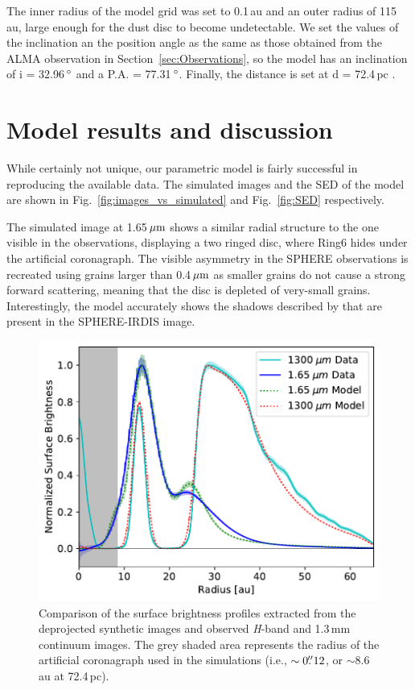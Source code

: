 \documentclass[letters,usenatbib,times]{mnras}
\begin{document}
The inner radius of the model grid was set to 0.1\,au and an outer radius of 115\,au, large enough for the dust disc to become undetectable. We set the values of the inclination an the position angle as the same as those obtained from the ALMA observation in Section~\ref{sec:Observations}, so the model has an inclination of i = 32.96\,$\hbox{$^\circ$}$ and a P.A. = 77.31\,$\hbox{$^\circ$}$. Finally, the distance is set at d = 72.4\,pc \citep{Gaia}.

\section{Model results and discussion} \label{sec:results}

While certainly not unique, our parametric model is fairly successful in reproducing the available data. The simulated images and the SED of the model are shown in Fig.~\ref{fig:images_vs_simulated} and Fig.~\ref{fig:SED} respectively.

The simulated image at 1.65\,$\hbox{$\mu$m}$ shows a similar radial structure to the one visible in the observations, displaying a two ringed disc, where Ring6 hides under the artificial coronagraph. The visible asymmetry in the SPHERE observations is recreated using grains larger than 0.4\,$\hbox{$\mu$m}$ as smaller grains do not cause a strong forward scattering, meaning that the disc is depleted of very-small grains. Interestingly, the model accurately shows the shadows described by \citet{dOrazi} that are present in the SPHERE-IRDIS image.

\begin{figure}
	\includegraphics[width=\columnwidth]{comp_fig_all_profiles_au.pdf}
    \caption{Comparison of the surface brightness profiles extracted from the deprojected synthetic images and observed \textit{H}-band and 1.3\,mm continuum images. The grey shaded area represents the radius of the artificial coronagraph used in the simulations (i.e., $\sim0\hbox{$.\!\!^{\prime\prime}$} 12$, or $\sim$8.6\,au at 72.4\,pc).}
    \label{fig:radprofiles}
\end{figure}
\end{document}
